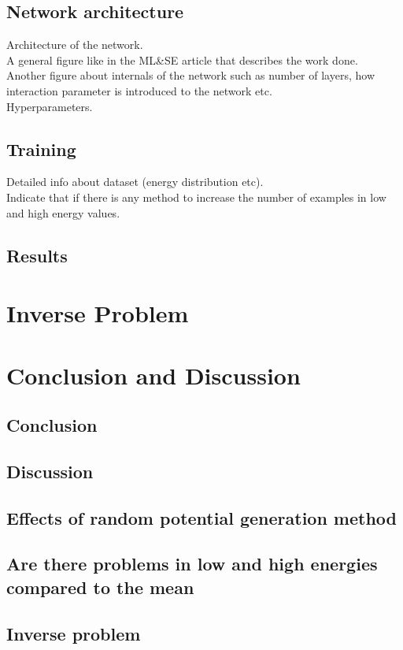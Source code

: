 \documentclass[a4paper,times,hidelinks,12pt]{article}
\begin{document}
\subsection{Network architecture}
\noindent Architecture of the network.\\
    A general figure like in the ML\&SE article that describes the work done.\\
    Another figure about internals of the network such as number of layers, how interaction parameter is introduced to the network etc.\\
    Hyperparameters.\\
\subsection{Training}
\noindent    Detailed info about dataset (energy distribution etc).\\
    Indicate that if there is any method to increase the number of examples in low and high energy values.

\subsection{Results}

\section{Inverse Problem}

\clearpage
\section{Conclusion and Discussion}
\subsection{Conclusion}
\subsection{Discussion}
\subsection{Effects of random potential generation method}
\subsection{Are there problems in low and high energies compared to the mean}
\subsection{Inverse problem}
\end{document}
